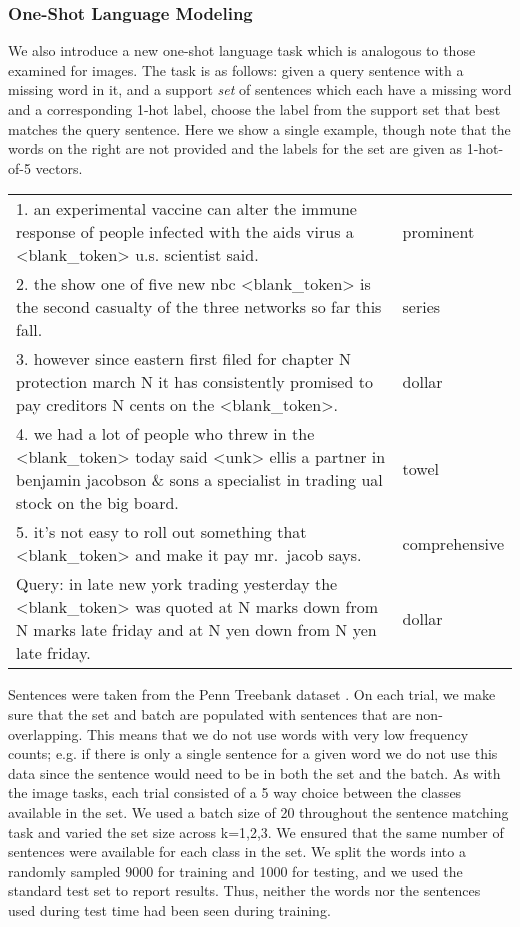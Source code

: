 \subsubsection{One-Shot Language Modeling}
\label{sec:ptb}
\vspace{-0.08in}

We also introduce a new one-shot language task which is analogous to those examined for images.  The task is as follows: given a query sentence with a missing word in it, and a support {\em set} of sentences which each have a missing word and a corresponding 1-hot label, choose the label from the support set that best matches the query sentence.  Here we show a single example, though note that the words on the right are not provided and the labels for the set are given as 1-hot-of-5 vectors.

\begin{tiny}
\begin{tt}
\begin{tabular}{|p{}|p{}}
1. an experimental vaccine can alter the immune response of people infected with the aids virus a <blank\_token> u.s. scientist said.   
&  prominent \\
2. the show one of five new nbc <blank\_token> is the second casualty of the three networks so far this fall.     
& series \\
3. however since eastern first filed for chapter N protection march N it has consistently promised to pay creditors N cents on the <blank\_token>.
& dollar \\
4. we had a lot of people who threw in the <blank\_token> today said <unk> ellis a partner in benjamin jacobson \& sons a specialist in trading ual stock on the big board. 
& towel \\
5. it's not easy to roll out something that <blank\_token> and make it pay mr.~jacob says.
& comprehensive \\
\hline
Query: in late new york trading yesterday the <blank\_token> was quoted at N marks down from N marks late friday and at N yen down from N yen late friday. 
& dollar \\
\end{tabular}
\end{tt}
\end{tiny}

Sentences were taken from the Penn Treebank dataset \cite{marcus1993building}.  On each trial, we make sure that the set and batch are populated with sentences that are non-overlapping.  This means that we do not use words with very low frequency counts; e.g. if there is only a single sentence for a given word we do not use this data since the sentence would need to be in both the set and the batch.  As with the image tasks, each trial consisted of a 5 way choice between the classes available in the set.  We used a batch size of 20 throughout the sentence matching task and varied the set size across k=1,2,3.  We ensured that the same number of sentences were available for each class in the set. We split the words into a randomly sampled 9000 for training and 1000 for testing, and we used the standard test set to report results. Thus, neither the words nor the sentences used during test time had been seen during training.

